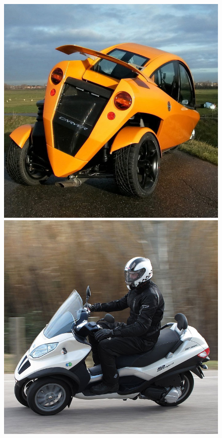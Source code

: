\begin{figure}[h]
		  \includegraphics[width=1.0\linewidth]{figs/02/carver}
		\endminipage\hfill
		  \includegraphics[width=1.0\linewidth]{figs/02/piaggio}

\end{figure}
